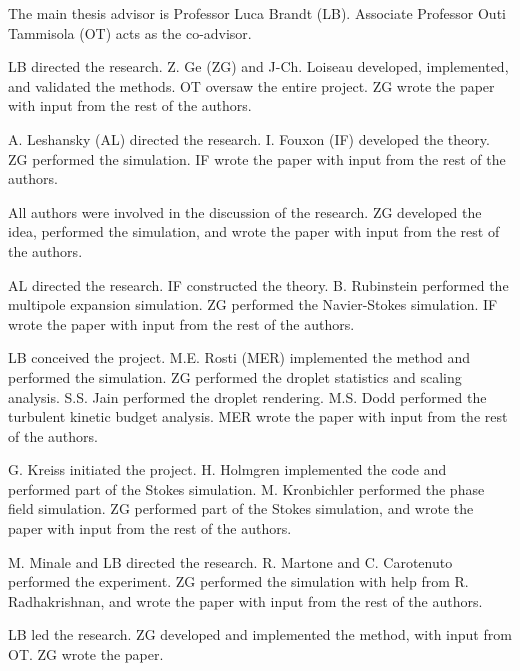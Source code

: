%
\begin{divisionofwork}
	The main thesis advisor is Professor Luca Brandt (LB).
	Associate Professor Outi Tammisola (OT) acts as the co-advisor.

	\paperitem
                LB directed the research.
                Z. Ge (ZG) and J-Ch. Loiseau developed, implemented, and validated the methods.
                OT oversaw the entire project.
		ZG wrote the paper with input from the rest of the authors.

	\paperitem
                A. Leshansky (AL) directed the research.
                I. Fouxon (IF) developed the theory.
		ZG performed the simulation.
                IF wrote the paper with input from the rest of the authors.

	\paperitem
                All authors were involved in the discussion of the research.
		ZG developed the idea, performed the simulation,
                and wrote the paper with input from the rest of the authors.

	\paperitem
                AL directed the research.
                IF constructed the theory.
		B. Rubinstein performed the multipole expansion simulation.
                ZG performed the Navier-Stokes simulation.
                IF wrote the paper with input from the rest of the authors.

	\paperitem
                LB conceived the project.
                M.E. Rosti (MER) implemented the method and performed the simulation.
		ZG performed the droplet statistics and scaling analysis.
                S.S. Jain performed the droplet rendering.
                M.S. Dodd performed the turbulent kinetic budget analysis.
                MER wrote the paper with input from the rest of the authors.

	\paperitem
                G. Kreiss initiated the project.
                H. Holmgren implemented the code and performed part of the Stokes simulation.
                M. Kronbichler performed the phase field simulation.
		ZG performed part of the Stokes simulation, and 
                wrote the paper with input from the rest of the authors.

	\paperitem
                M. Minale and LB directed the research.
                R. Martone and C. Carotenuto performed the experiment.
		ZG performed the simulation with help from R. Radhakrishnan,
                and wrote the paper with input from the rest of the authors.

	\paperitem
                LB led the research.
		ZG developed and implemented the method, with input from OT.
                ZG wrote the paper.

               

\end{divisionofwork}


